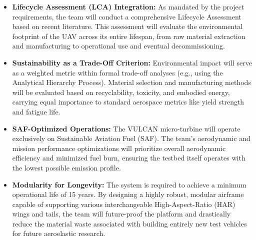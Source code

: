 \begin{itemize}[leftmargin=*]
    \item \textbf{Lifecycle Assessment (LCA) Integration:} As mandated by the project requirements, the team will conduct a comprehensive Lifecycle Assessment based on recent literature. This assessment will evaluate the environmental footprint of the UAV across its entire lifespan, from raw material extraction and manufacturing to operational use and eventual decommissioning.
    
    \item \textbf{Sustainability as a Trade-Off Criterion:} Environmental impact will serve as a weighted metric within formal trade-off analyses (e.g., using the Analytical Hierarchy Process). Material selection and manufacturing methods will be evaluated based on recyclability, toxicity, and embodied energy, carrying equal importance to standard aerospace metrics like yield strength and fatigue life.
    
    \item \textbf{SAF-Optimized Operations:} The VULCAN micro-turbine will operate exclusively on Sustainable Aviation Fuel (SAF). The team's aerodynamic and mission performance optimizations will prioritize overall aerodynamic efficiency and minimized fuel burn, ensuring the testbed itself operates with the lowest possible emission profile.
    
    \item \textbf{Modularity for Longevity:} The system is required to achieve a minimum operational life of 15 years. By designing a highly robust, modular airframe capable of supporting various interchangeable High-Aspect-Ratio (HAR) wings and tails, the team will future-proof the platform and drastically reduce the material waste associated with building entirely new test vehicles for future aeroelastic research.
\end{itemize}
